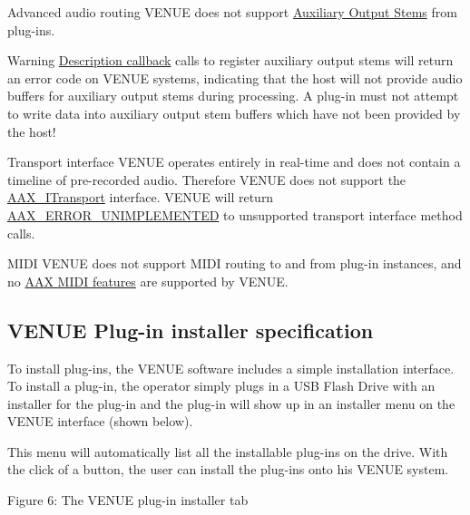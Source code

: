  
\begin{DoxyItemize}
\item Advanced audio routing  V\+E\+N\+U\+E does not support \hyperlink{a00339}{Auxiliary Output Stems} from plug-\/ins.

\begin{DoxyWarning}{Warning}
\hyperlink{a00326}{Description callback} calls to register auxiliary output stems will return an error code on V\+E\+N\+U\+E systems, indicating that the host will not provide audio buffers for auxiliary output stems during processing. A plug-\/in must not attempt to write data into auxiliary output stem buffers which have not been provided by the host!  
\end{DoxyWarning}

\item Transport interface  V\+E\+N\+U\+E operates entirely in real-\/time and does not contain a timeline of pre-\/recorded audio. Therefore V\+E\+N\+U\+E does not support the \hyperlink{a00116}{A\+A\+X\+\_\+\+I\+Transport} interface. V\+E\+N\+U\+E will return \hyperlink{a00207_a5f8c7439f3a706c4f8315a9609811937a3b76994b32b97fcd56b19ef8032245df}{A\+A\+X\+\_\+\+E\+R\+R\+O\+R\+\_\+\+U\+N\+I\+M\+P\+L\+E\+M\+E\+N\+T\+E\+D} to unsupported transport interface method calls.  
\item M\+I\+D\+I  V\+E\+N\+U\+E does not support M\+I\+D\+I routing to and from plug-\/in instances, and no \hyperlink{a00336}{A\+A\+X M\+I\+D\+I features} are supported by V\+E\+N\+U\+E.  
\end{DoxyItemize}



 \hypertarget{a00377_aax_venue_guide__installer}{}\subsection{V\+E\+N\+U\+E Plug-\/in installer specification}\label{a00377_aax_venue_guide__installer}
 To install plug-\/ins, the V\+E\+N\+U\+E software includes a simple installation interface. To install a plug-\/in, the operator simply plugs in a U\+S\+B Flash Drive with an installer for the plug-\/in and the plug-\/in will show up in an installer menu on the V\+E\+N\+U\+E interface (shown below).

 This menu will automatically list all the installable plug-\/ins on the drive. With the click of a button, the user can install the plug-\/ins onto his V\+E\+N\+U\+E system.

  Figure 6\+: The V\+E\+N\+U\+E plug-\/in installer tab

